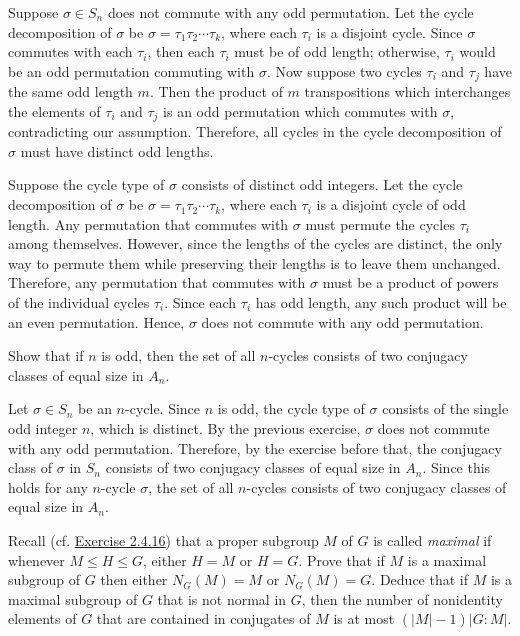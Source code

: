 \begin{sol}
	\rightimp Suppose $\sigma \in S_n$ does not commute with any odd permutation. Let the cycle decomposition of $\sigma$ be $\sigma = \tau_1\tau_2\cdots\tau_k$, where each $\tau_i$ is a disjoint cycle. Since $\sigma$ commutes with each $\tau_i$, then each $\tau_i$ must be of odd length; otherwise, $\tau_i$ would be an odd permutation commuting with $\sigma$. Now suppose two cycles $\tau_i$ and $\tau_j$ have the same odd length $m$. Then the product of $m$ transpositions which interchanges the elements of $\tau_i$ and $\tau_j$ is an odd permutation which commutes with $\sigma$, contradicting our assumption. Therefore, all cycles in the cycle decomposition of $\sigma$ must have distinct odd lengths.

	\leftimp Suppose the cycle type of $\sigma$ consists of distinct odd integers. Let the cycle decomposition of $\sigma$ be $\sigma = \tau_1\tau_2\cdots\tau_k$, where each $\tau_i$ is a disjoint cycle of odd length. Any permutation that commutes with $\sigma$ must permute the cycles $\tau_i$ among themselves. However, since the lengths of the cycles are distinct, the only way to permute them while preserving their lengths is to leave them unchanged. Therefore, any permutation that commutes with $\sigma$ must be a product of powers of the individual cycles $\tau_i$. Since each $\tau_i$ has odd length, any such product will be an even permutation. Hence, $\sigma$ does not commute with any odd permutation.
\end{sol}

\begin{exercise}
	Show that if $n$ is odd, then the set of all $n$-cycles consists of two conjugacy classes of equal size in $A_n$.
\end{exercise}

\begin{sol}
	Let $\sigma \in S_n$ be an $n$-cycle. Since $n$ is odd, the cycle type of $\sigma$ consists of the single odd integer $n$, which is distinct. By the previous exercise, $\sigma$ does not commute with any odd permutation. Therefore, by the exercise before that, the conjugacy class of $\sigma$ in $S_n$ consists of two conjugacy classes of equal size in $A_n$. Since this holds for any $n$-cycle $\sigma$, the set of all $n$-cycles consists of two conjugacy classes of equal size in $A_n$.
\end{sol}

\begin{exercise}\label{ex4.3.23}
	Recall (cf. \hyperref[ex2.4.16]{Exercise 2.4.16}) that a proper subgroup $M$ of $G$ is called \emph{maximal} if whenever $M \leq H \leq G$, either $H = M$ or $H = G$. Prove that if $M$ is a maximal subgroup of $G$ then either $N_G(M) = M$ or $N_G(M) = G$. Deduce that if $M$ is a maximal subgroup of $G$ that is not normal in $G$, then the number of nonidentity elements of $G$ that are contained in conjugates of $M$ is at most $(|M| - 1)|G : M|$.
\end{exercise}

